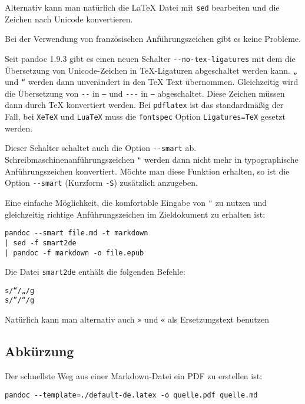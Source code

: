 \documentclass[11pt,ngerman,a4paper]{article}
\begin{document}
Alternativ kann man natürlich die LaTeX Datei mit \texttt{sed}
bearbeiten und die Zeichen nach Unicode konvertieren.

Bei der Verwendung von französischen Anführungszeichen gibt es keine
Probleme.

Seit pandoc 1.9.3 gibt es einen neuen Schalter
\texttt{-{}-no-tex-ligatures} mit dem die Übersetzung von
Unicode-Zeichen in TeX-Ligaturen abgeschaltet werden kann. \texttt{„}
und \texttt{``} werden dann unverändert in den TeX Text übernommen.
Gleichzeitig wird die Übersetzung von \texttt{-{}-} in \texttt{--} und
\texttt{-{}-{}-} in \texttt{---} abgeschaltet. Diese Zeichen müssen dann
durch TeX konvertiert werden. Bei \texttt{pdflatex} ist das
standardmäßig der Fall, bei \texttt{XeTeX} und \texttt{LuaTeX} muss die
\texttt{fontspec} Option \texttt{Ligatures=TeX} gesetzt werden.

Dieser Schalter schaltet auch die Option \texttt{-{}-smart} ab.
Schreibmaschinenanführungszeichen \texttt{"} werden dann nicht mehr in
typographische Anführungszeichen konvertiert. Möchte man diese Funktion
erhalten, so ist die Option \texttt{-{}-smart} (Kurzform \texttt{-S})
zusätzlich anzugeben.

Eine einfache Möglichkeit, die komfortable Eingabe von \texttt{"} zu
nutzen und gleichzeitig richtige Anführungszeichen im Zieldokument zu
erhalten ist:

\begin{verbatim}
pandoc --smart file.md -t markdown 
| sed -f smart2de 
| pandoc -f markdown -o file.epub
\end{verbatim}

Die Datei \texttt{smart2de} enthält die folgenden Befehle:

\begin{verbatim}
s/“/„/g
s/”/“/g
\end{verbatim}

Natürlich kann man alternativ auch \texttt{»} und \texttt{«} als
Ersetzungstext benutzen

\subsection{Abkürzung}

Der schnellste Weg aus einer Markdown-Datei ein PDF zu erstellen ist:

\begin{verbatim}
pandoc --template=./default-de.latex -o quelle.pdf quelle.md
\end{verbatim}
\end{document}
